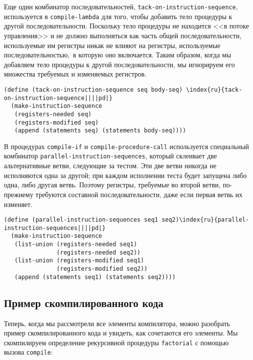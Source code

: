 Еще один комбинатор последовательностей,
{\tt tack-on-instruction-se\-qu\-ence}, используется в
{\tt compile-lambda} для того, чтобы добавить тело процедуры к
другой последовательности.  Поскольку тело процедуры не находится <<в
потоке управления>> и не должно выполняться как часть общей
последовательности, используемые им регистры никак не влияют на
регистры, используемые последовательностью,~в которую оно включается.
Таким образом, когда мы добавляем тело процедуры к другой
последовательности, мы игнорируем его множества требуемых и изменяемых
регистров.

\begin{Verbatim}[fontsize=\small]
(define (tack-on-instruction-sequence seq body-seq) \index{ru}{tack-on-instruction-sequence||||pd|}
  (make-instruction-sequence
   (registers-needed seq)
   (registers-modified seq)
   (append (statements seq) (statements body-seq))))
\end{Verbatim}

В процедурах {\tt compile-if} и
{\tt compile-procedure-call} используется специальный
комбинатор {\tt parallel-instruction-sequences}, который
склеивает две альтернативные ветви, следующие за тестом.  Эти две
ветви никогда не исполняются одна за другой; при каждом исполнении
теста будет запущена либо одна, либо другая ветвь.  Поэтому регистры,
требуемые во второй ветви, по-прежнему требуются составной
последовательности, даже если первая ветвь их изменяет.
{\sloppy

}
\begin{Verbatim}[fontsize=\small]
(define (parallel-instruction-sequences seq1 seq2)\index{ru}{parallel-instruction-sequences||||pd|}
  (make-instruction-sequence
   (list-union (registers-needed seq1)
               (registers-needed seq2))
   (list-union (registers-modified seq1)
               (registers-modified seq2))
   (append (statements seq1) (statements seq2))))
\end{Verbatim}

\subsection{Пример скомпилированного кода}
\label{AN-EXAMPLE-OF-COMPILED-CODE}


Теперь, когда мы рассмотрели все элементы компилятора,
можно разобрать пример скомпилированного кода и увидеть, как
сочетаются его элементы.  Мы скомпилируем определение рекурсивной
процедуры {\tt factorial} с помощью вызова
{\tt compile}:

